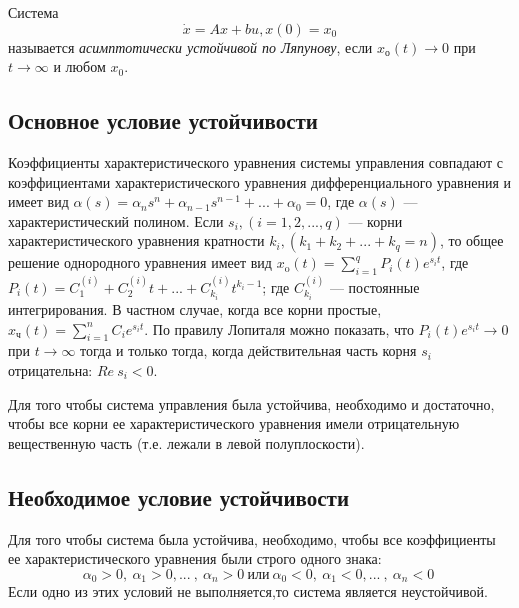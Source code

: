 \documentclass[../../TAU.tex]{subfiles}
\begin{document}
    Система 
    \begin{equation}\label{LIN_DS_3_1}
        \dot x = Ax + bu, x(0) = x_0
    \end{equation} 
    называется 
    {\it асимптотически устойчивой по Ляпунову}, если 
    $x_\text{о}(t)\rightarrow0$ 
    при 
    $t\rightarrow\infty$ 
    и любом $x_0$.\par

\subsection{Основное условие устойчивости}

    Коэффициенты характеристического уравнения системы управления совпадают с коэффициентами характеристического уравнения дифференциального уравнения и имеет вид
    $\alpha(s)=\alpha_ns^n+\alpha_{n-1}s^{n-1}+...+\alpha_0=0$, 
    где $\alpha(s)$ --- 
    характеристический полином. Если 
    $s_i, (i=1,2,...,q)$ ---
    корни характеристического уравнения кратности
    $k_i, (k_1+k_2+...+k_q=n)$, 
    то общее решение однородного уравнения имеет вид 
    $x_\text{o}(t)=\sum_{i=1}^q{P_i(t) e^{s_i t}}$, 
    где 
    $P_i(t)=C_1^{(i)}+C_2^{(i)} t+...+C_{k_i}^{(i)} t^{k_i-1}$; 
    где 
    $C_{k_i}^{(i)}$ --- постоянные   интегрирования. 
    В частном случае, когда все корни простые, 
    $x_\text{ч}(t)=\sum_{i=1}^nC_i e^{s_i t}$. 
    По правилу Лопиталя можно показать, что 
    $P_i(t) e^{s_i t}\rightarrow 0 $
    при 
    $t\rightarrow\infty$ 
    тогда и только тогда, когда действительная часть корня 
    $s_i$
    отрицательна: 
    $Re\ {s_i}<0$. 

     Для того чтобы система управления была устойчива, необходимо и достаточно, чтобы все корни ее характеристического уравнения имели отрицательную вещественную часть (т.е. лежали в левой полуплоскости). 

\subsection{Необходимое условие устойчивости}

    \cite[стр. 130]{voron} Для того чтобы система была устойчива, необходимо, чтобы все коэффициенты ее характеристического уравнения были строго одного знака: 
    $$
        \alpha_0>0,\ \alpha_1>0, ...\ ,\ \alpha_n>0\ \text{или}\ \alpha_0<0,\ \alpha_1<0, ...\ ,\ \alpha_n<0\ 
    $$
    Если одно из этих условий не выполняется,то система является неустойчивой.
\end{document}
